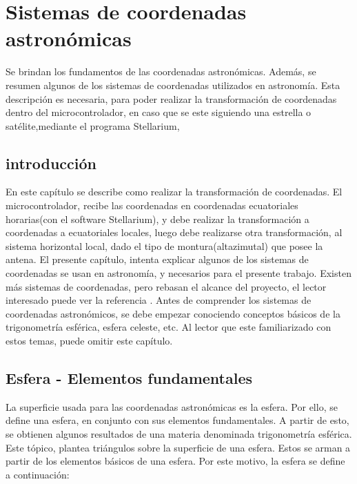 \renewcommand{\chaptername}{Sistemas de coordenadas astronómicas}
\graphicspath{{parte_3/sist_coord/}}
\chapter{Sistemas de coordenadas astronómicas} \label{cap:sist_cord} 
\begin{center}
	\begin{tcolorbox}[colback=gray!5!white, %
		colframe=blue!75!black,
		title= \center{\Large{Resumen}} ]
	Se brindan los fundamentos de las coordenadas astronómicas. Además, se resumen algunos de los sistemas de coordenadas utilizados en astronomía. Esta descripción es necesaria, para poder realizar la transformación de coordenadas dentro del microcontrolador, en caso que se este siguiendo una estrella o satélite,mediante el programa Stellarium,
	\end{tcolorbox}
\end{center}    

\section{introducción} 

En este capítulo se describe como realizar la transformación de coordenadas. El microcontrolador, recibe las coordenadas en coordenadas ecuatoriales horarias(con el software Stellarium), y debe realizar la transformación a coordenadas a ecuatoriales locales, luego debe realizarse otra transformación, al sistema horizontal local, dado el tipo de montura(altazimutal) que posee la antena. El presente capítulo, intenta explicar algunos de los sistemas de coordenadas se usan en astronomía, y necesarios para el presente trabajo. Existen más sistemas de coordenadas, pero rebasan el alcance del proyecto, el lector interesado puede ver la referencia \cite{Baume2014}. Antes de comprender los sistemas de coordenadas astronómicos, se debe empezar conociendo conceptos básicos de la trigonometría esférica, esfera celeste, etc. Al lector que este familiarizado con estos temas, puede omitir este capítulo. 

\section{Esfera - Elementos fundamentales} 


La superficie usada para las coordenadas astronómicas es la esfera. Por ello, se define una esfera, en conjunto con sus elementos fundamentales. A partir de esto, se obtienen algunos resultados de una materia denominada trigonometría esférica. Este tópico, plantea triángulos sobre la superficie de una esfera. Estos se arman a partir de los elementos básicos de una esfera. Por este motivo, la esfera se define a continuación: 


